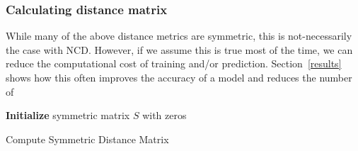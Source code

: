 \documentclass[sigconf]{acmart}
\begin{document}

\subsubsection{Calculating distance matrix}

While many of the above distance metrics are symmetric, this is not-necessarily the case with NCD. However, if we assume this is true most of the time, we can reduce the computational cost of training and/or prediction. Section~\ref{results} shows how this often improves the accuracy of a model and reduces the number of 



\begin{algorithm}
  \BlankLine
  \textbf{Initialize} symmetric matrix $S$ with zeros\;
  \BlankLine
  \caption{Compute Symmetric Distance Matrix}
  \label{alg:symmetric-distance-matrix}
\end{algorithm}


\end{document}
